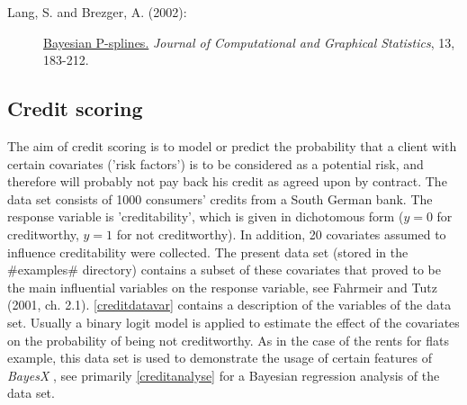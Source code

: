 \begin{description}

\item[Lang, S. and Brezger, A. (2002):] \href{http://www.stat.uni-muenchen.de/~lang/publications.html}
{Bayesian P-splines.} {\it Journal of Computational and Graphical
Statistics}, 13, 183-212.

\end{description}


\subsection{Credit scoring}
\label{creditdata}  

The aim of credit scoring is to model or predict the probability
that a client with certain covariates ('risk factors') is to be
considered as a potential risk, and therefore will probably not
pay back his credit as agreed upon by contract. The data set
consists of 1000 consumers' credits from a South German bank. The
response variable is 'creditability', which is given in
dichotomous form ($y=0$ for creditworthy, $y=1$ for not
creditworthy). In addition, 20 covariates assumed to influence
creditability were collected. The present data set (stored in the
#examples# directory)  contains a subset of these covariates
that proved to be the main influential variables on the response
variable, see Fahrmeir and Tutz (2001, ch. 2.1). \autoref{creditdatavar}
contains a description of the variables of the data set. Usually a
binary logit model is applied to estimate the effect of the
covariates on the probability of being not creditworthy. As in the
case of the rents for flats example, this data set is used to
demonstrate the usage of certain features of {\em BayesX} , see
primarily \autoref{creditanalyse} for a Bayesian regression
analysis of the data set.

